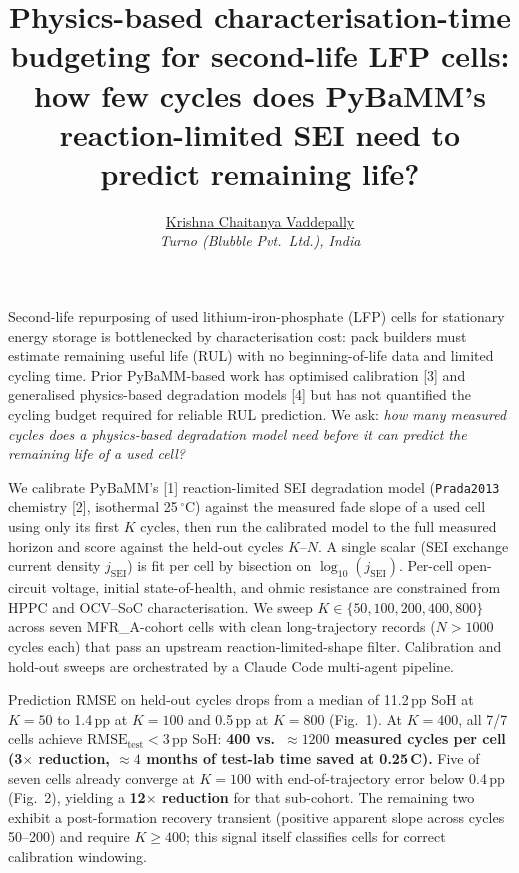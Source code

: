 \documentclass[12pt,a4paper]{article}
\title{\vspace{-1.0cm}\textbf{\normalsize Physics-based characterisation-time
budgeting for second-life LFP cells:\\ how few cycles does PyBaMM's
reaction-limited SEI need to predict remaining life?}}
\author{\normalsize \underline{Krishna Chaitanya Vaddepally}\\[-0.3em]
  \small \emph{Turno (Blubble Pvt.\ Ltd.), India}}
\date{}
\begin{document}
\maketitle
\thispagestyle{empty}

\vspace{-3.6em}
Second-life repurposing of used lithium-iron-phosphate (LFP) cells for
stationary energy storage is bottlenecked by characterisation cost:
pack builders must estimate remaining useful life (RUL) with no
beginning-of-life data and limited cycling time. Prior PyBaMM-based
work has optimised calibration [3] and generalised physics-based
degradation models [4] but has not quantified the cycling budget
required for reliable RUL prediction. We ask: \emph{how many measured
cycles does a physics-based degradation model need before it can
predict the remaining life of a used cell?}

We calibrate PyBaMM's [1] reaction-limited SEI degradation model
(\texttt{Prada2013} chemistry [2], isothermal 25\,$^{\circ}$C) against
the measured fade slope of a used cell using only its first $K$ cycles,
then run the calibrated model to the full measured horizon and score
against the held-out cycles $K$--$N$. A single scalar (SEI exchange
current density $j_{\text{SEI}}$) is fit per cell by bisection on
$\log_{10}(j_{\text{SEI}})$. Per-cell open-circuit voltage, initial
state-of-health, and ohmic resistance are constrained from HPPC and
OCV--SoC characterisation. We sweep $K \in \{50, 100, 200, 400, 800\}$
across seven MFR\_A-cohort cells with clean long-trajectory records
($N > 1000$ cycles each) that pass an upstream reaction-limited-shape
filter. Calibration and hold-out sweeps are orchestrated by a Claude
Code multi-agent pipeline.

Prediction RMSE on held-out cycles drops from a median of 11.2\,pp SoH
at $K=50$ to 1.4\,pp at $K=100$ and 0.5\,pp at $K=800$ (Fig.~1). At
$K=400$, all 7/7 cells achieve $\text{RMSE}_{\text{test}} < 3$\,pp SoH:
\textbf{400 vs.\ ${\approx}1200$ measured cycles per cell (3$\times$
reduction, ${\approx}4$ months of test-lab time saved at 0.25\,C).}
Five of seven cells already converge at $K=100$ with end-of-trajectory
error below 0.4\,pp (Fig.~2), yielding a \textbf{12$\times$ reduction}
for that sub-cohort. The remaining two exhibit a post-formation recovery
transient (positive apparent slope across cycles 50--200) and require
$K \geq 400$; this signal itself classifies cells for correct
calibration windowing.
\end{document}
